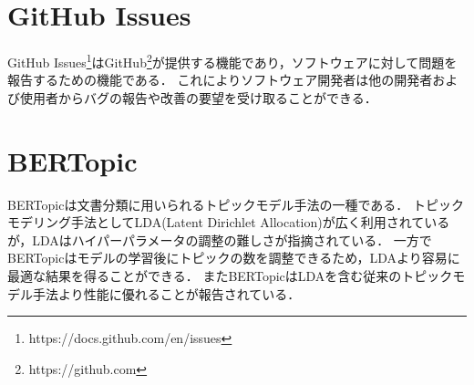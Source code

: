 \documentclass[main]{subfiles}
\begin{document}
\section{GitHub Issues}

GitHub Issues\footnote{https://docs.github.com/en/issues}はGitHub\footnote{https://github.com}が提供する機能であり，ソフトウェアに対して問題を報告するための機能である．
これによりソフトウェア開発者は他の開発者および使用者からバグの報告や改善の要望を受け取ることができる．

\section{BERTopic}

BERTopicは文書分類に用いられるトピックモデル手法の一種である．
トピックモデリング手法としてLDA(Latent Dirichlet Allocation)が広く利用されているが，LDAはハイパーパラメータの調整の難しさが指摘されている\cite{panichella:2021}．
一方でBERTopicはモデルの学習後にトピックの数を調整できるため，LDAより容易に最適な結果を得ることができる．
またBERTopicはLDAを含む従来のトピックモデル手法より性能に優れることが報告されている\cite{egger:2022}．
\end{document}
